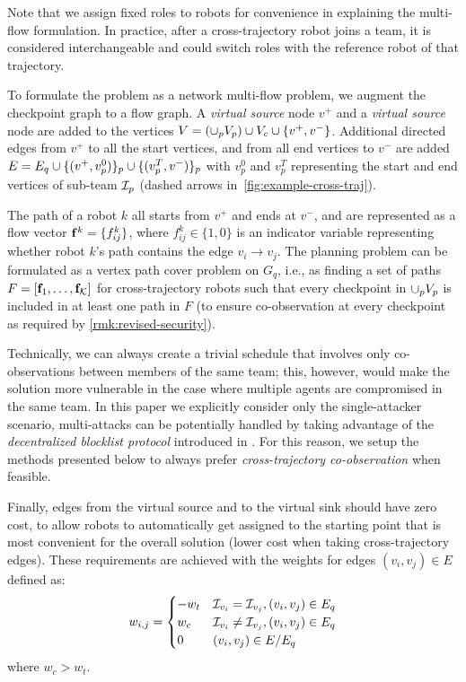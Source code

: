 \documentclass[10pt,twocolumn,twoside]{IEEEtran}
\begin{document}
\begin{remark}
Note that we assign fixed roles to robots for convenience in explaining the multi-flow formulation. In practice, after a cross-trajectory robot joins a team, it is considered interchangeable and could switch roles with the reference robot of that trajectory. 
\end{remark}

To formulate the problem as a network multi-flow problem, we augment the checkpoint graph to a flow graph. A \emph{virtual source} node $v^{+}$ and a \emph{virtual source} node are added to the vertices $V= (\cup_p V_p) \cup V_c \cup \{v^{+},v^{-}\}$. Additional directed edges from $v^{+}$ to all the start vertices, and from all end vertices to $v^{-}$ are added $E = E_{q} \cup \{(v^{+},v^{0}_{p})\}_{p} \cup \{( v^{T}_{p},v^{-})\}_{p}$ with $v^0_p$ and $v^T_p$ representing the start and end vertices of sub-team $\mathcal{I}_p$ (dashed arrows in~\cref{fig:example-cross-traj}).

The path of a robot $k$ all starts from $v^{+}$ and ends at $v^{-}$, and are represented as a flow vector $\mathbf{f}^{k} = \{ f^{k}_{ij} \}$, where $f^{k}_{ij} \in \{1,0\}$ is an indicator variable representing whether robot $k$'s path contains the edge $v_{i}\to v_{j}$. 
The planning problem can be formulated as a vertex path cover problem on $G_{q}$, i.e., as finding a set of paths $F=[\mathbf{f}_{1},\dots, \mathbf{f}_{\mathcal{K}}]$ for cross-trajectory robots such that every checkpoint in $\cup_p V_{p}$ is included in at least one path in $F$ (to ensure co-observation at every checkpoint as required by \cref{rmk:revised-security}). 

Technically, we can always create a trivial schedule that involves only co-observations between members of the same team; this, however, would make the solution more vulnerable in the case where multiple agents are compromised in the same team. In this paper we explicitly consider only the single-attacker scenario, multi-attacks can be potentially handled by taking advantage of the \emph{decentralized blocklist protocol} introduced in \cite{wardega2023byzantine}. For this reason, we setup the methods presented below to always prefer \emph{cross-trajectory co-observation} when feasible.

Finally, edges from the virtual source and to the virtual sink should have zero cost, to allow robots to automatically get assigned to the starting point that is most convenient for the overall solution (lower cost when taking cross-trajectory edges).
These requirements are achieved with the weights for edges $(v_{i},v_{j})\in E$ defined as:
\begin{equation}
	w_{i,j}=\begin{cases}
	-w_{t} & \mathcal{I}_{v_{i}}=\mathcal{I}_{v_{j}}, (v_{i},v_{j})\in E_{q}\\
	w_{c} & \mathcal{I}_{v_{i}} \neq \mathcal{I}_{v_{j}}, (v_{i},v_{j})\in E_{q}\\
	0 &  (v_{i},v_{j})\in E / E_{q} 
	\end{cases}
\end{equation}
where $w_{c} > w_{t}$. 
\end{document}

